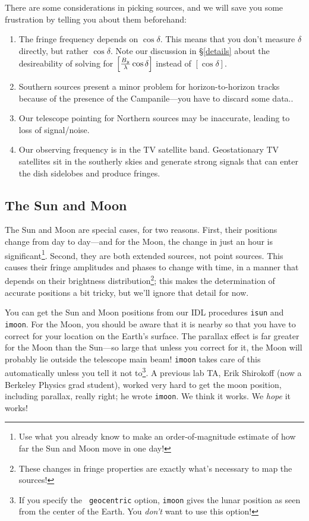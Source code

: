 \documentclass[11pt,preprint]{aastex}
\begin{document}
	There are some considerations in picking sources, and we will
save you some frustration by telling you about them beforehand:
\begin{enumerate}


	\item The fringe frequency depends on $\cos \delta$. This means
that you don't measure $\delta$ directly, but rather $\cos \delta$. Note
our discussion in \S\ref{details} about the desireability of solving for
$\left[{B_y \over \lambda}\cos \delta \right]$ instead of $[\cos{\delta}]$.

	\item Southern sources present a minor problem for
horizon-to-horizon tracks because of the presence of the Campanile---you
have to discard some data..

	\item Our telescope pointing for Northern sources may be
inaccurate, leading to loss of signal/noise. 

	\item Our observing frequency is in the TV satellite band. 
Geostationary TV satellites sit in the southerly skies and generate
strong signals that can enter the dish sidelobes and produce fringes. 

\end{enumerate}

\subsection{The Sun and Moon}

	The Sun and Moon are special cases, for two reasons. First, 
their positions change from day to day---and for the Moon, the change in
just an hour is significant\footnote{Use what you already know to make
an order-of-magnitude estimate of how far the Sun and Moon move in one
day!}.  Second, they are both extended sources, not point sources. This
causes their fringe amplitudes and phases to change with time, in a
manner that depends on their brightness distribution\footnote{These
changes in fringe properties are exactly what's necessary to map the
sources!}; this makes the determination of accurate positions a bit
tricky, but we'll ignore that detail for now.

	You can get the Sun and Moon positions from our IDL procedures
{\tt isun} and {\tt imoon}.  For the Moon, you should be aware that it
is nearby so that you have to correct for your location on the Earth's
surface. The parallax effect is far greater for the Moon than the
Sun---so large that unless you correct for it, the Moon will probably
lie outside the telescope main beam! {\tt imoon} takes care of this
automatically unless you tell it not to\footnote{If you specify the {\tt
geocentric} option, {\tt imoon} gives the lunar position as seen from
the center of the Earth. You {\it don't} want to use this option!}.  A
previous lab TA, Erik Shirokoff (now a Berkeley Physics grad student),
worked very hard to get the moon position, including parallax, really
right; he wrote {\tt imoon}. We think it works. We {\it hope} it works!
\end{document}
